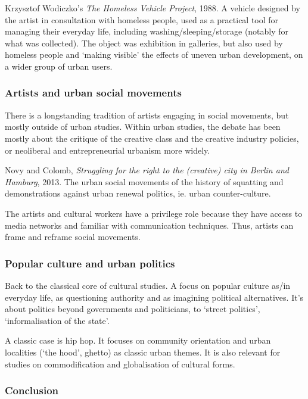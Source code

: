 \documentclass{article}
\begin{document}
Krzysztof Wodiczko's \textit{The Homeless Vehicle Project}, 1988. A vehicle designed by the artist in consultation with homeless people, used as a practical tool for managing their everyday life, including washing/sleeping/storage (notably for what was collected). The object was exhibition in galleries, but also used by homeless people and `making visible' the effects of uneven urban development, on a wider group of urban users.

\subsubsection{Artists and urban social movements}

There is a longstanding tradition of artists engaging in social movements, but mostly outside of urban studies. 
Within urban studies, the debate has been mostly about the critique of the creative class and the creative industry policies, or neoliberal and entrepreneurial urbanism more widely.

Novy and Colomb, \textit{Struggling for the right to the (creative) city in Berlin and Hamburg}, 2013.
The urban social movements of the history of squatting and demonstrations against urban renewal politics, ie. urban counter-culture.

The artists and cultural workers have a privilege role because they have access to media networks and familiar with communication techniques. Thus, artists can frame and reframe social movements. 

\subsubsection{Popular culture and urban politics}

Back to the classical core of cultural studies. A focus on popular culture as/in everyday life, as questioning authority and as imagining political alternatives. It's about politics beyond governments and politicians, to `street politics', `informalisation of the state'.

A classic case is hip hop. It focuses on community orientation and urban localities (`the hood', ghetto) as classic urban themes. It is also relevant for studies on commodification and globalisation of cultural forms.

\subsubsection{Conclusion}
\end{document}
